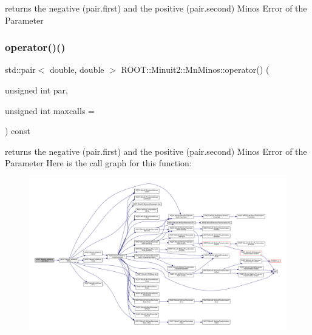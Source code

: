 returns the negative (pair.\+first) and the positive (pair.\+second) Minos Error of the Parameter \mbox{\label{classROOT_1_1Minuit2_1_1MnMinos_aa3605120b9628fe22416f723f25383b0}} 
\subsubsection{\texorpdfstring{operator()()}{operator()()}\hspace{0.1cm}{\footnotesize\ttfamily [2/2]}}
{\footnotesize\ttfamily std\+::pair$<$ double, double $>$ R\+O\+O\+T\+::\+Minuit2\+::\+Mn\+Minos\+::operator() (\begin{DoxyParamCaption}\item[{unsigned int}]{par,  }\item[{unsigned int}]{maxcalls = {} }\end{DoxyParamCaption}) const}

returns the negative (pair.\+first) and the positive (pair.\+second) Minos Error of the Parameter Here is the call graph for this function\+:\nopagebreak
\begin{figure}[H]
\begin{center}
\leavevmode
\includegraphics[width=350pt]{dc/d91/classROOT_1_1Minuit2_1_1MnMinos_aa3605120b9628fe22416f723f25383b0_cgraph}
\end{center}
\end{figure}
\mbox{\label{classROOT_1_1Minuit2_1_1MnMinos_a387b76e3135998c519db7e6ae4cc3d90}} 
